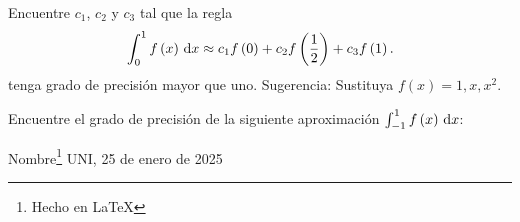 \begin{questions}
\begin{multicols}{3}
    \end{multicols}

    \question


    Encuentre $c_{1}$, $c_{2}$ y $c_{3}$ tal que la regla
    \begin{equation*}
        \int_{0}^{1}
        f\left(x\right)\dl x\approx
        c_{1}f\left(0\right)+
        c_{2}f\left(\frac{1}{2}\right)+
        c_{3}f\left(1\right).
    \end{equation*}
    tenga grado de precisión mayor que uno.
    Sugerencia: Sustituya $f\left(x\right)=1,x,x^{2}$.

    \question

    Encuentre el grado de precisión de la siguiente aproximación
    \begin{math}
        \int_{-1}^{1}f\left(x\right)\dl x
    \end{math}:

    \begin{multicols}{3}
    \end{multicols}

\end{questions}

\providecommand{\name}{Nombre}
\vfill{Nombre}\footnote{Hecho en \LaTeX}
\hfill{UNI, 25 de enero de 2025}

